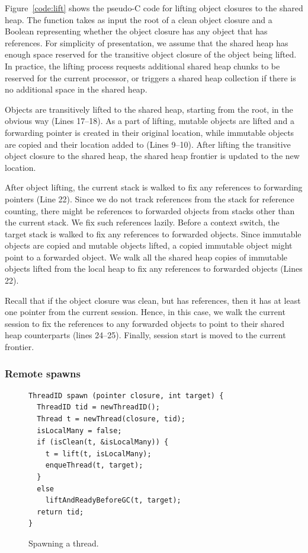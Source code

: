 Figure~\ref{code:lift} shows the pseudo-C code for lifting object closures to
the shared heap. The function  takes as input the root of a clean
object closure and a Boolean representing whether the object closure has any
object that has  references. For simplicity of presentation, we
assume that the shared heap has enough space reserved for the transitive object
closure of the object being lifted. In practice, the lifting process requests
additional shared heap chunks to be reserved for the current processor, or
triggers a shared heap collection if there is no additional space in the shared
heap.

Objects are transitively lifted to the shared heap, starting from the root, in
the obvious way (Lines 17--18). As a part of lifting, mutable objects are
lifted and a forwarding pointer is created in their original location, while
immutable objects are copied and their location added to  (Lines
9--10). After lifting the transitive object closure to the shared heap, the
shared heap frontier is updated to the new location.

After object lifting, the current stack is walked to fix any references to
forwarding pointers (Line 22). Since we do not track references from the stack
for reference counting, there might be references to forwarded objects from
stacks other than the current stack. We fix such references lazily. Before a
context switch, the target stack is walked to fix any references to forwarded
objects. Since immutable objects are copied and mutable objects lifted, a
copied immutable object might point to a forwarded object. We walk all the
shared heap copies of immutable objects lifted from the local heap to fix any
references to forwarded objects (Lines 22).

Recall that if the object closure was clean, but has 
references, then it has at least one pointer from the current session. Hence,
in this case, we walk the current session to fix the references to any
forwarded objects to point to their shared heap counterparts (lines 24--25).
Finally, session start is moved to the current frontier.

\subsubsection{Remote spawns}
\label{sec:remote_spawns}

\begin{figure}[t]
\begin{lstlisting}
ThreadID spawn (pointer closure, int target) {
  ThreadID tid = newThreadID();
  Thread t = newThread(closure, tid);
  isLocalMany = false;
  if (isClean(t, &isLocalMany)) {
    t = lift(t, isLocalMany);
    enqueThread(t, target);
  }
  else
    liftAndReadyBeforeGC(t, target);
  return tid;
}
\end{lstlisting}
\caption{Spawning a thread.}
\label{code:spawn}
\end{figure}

